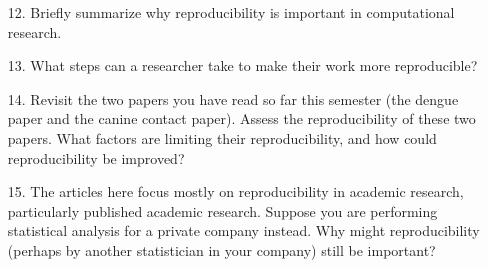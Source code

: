 \documentclass[12pt]{article}
\begin{document}
\begin{enumerate}
\item[12.] Briefly summarize why reproducibility is important in computational research.

\item[13.] What steps can a researcher take to make their work more reproducible?

\item[14.] Revisit the two papers you have read so far this semester (the dengue paper and the canine contact paper). Assess the reproducibility of these two papers. What factors are limiting their reproducibility, and how could reproducibility be improved?

\item[15.] The articles here focus mostly on reproducibility in academic research, particularly published academic research. Suppose you are performing statistical analysis for a private company instead. Why might reproducibility (perhaps by another statistician in your company) still be important?
\end{enumerate}
\end{document}
